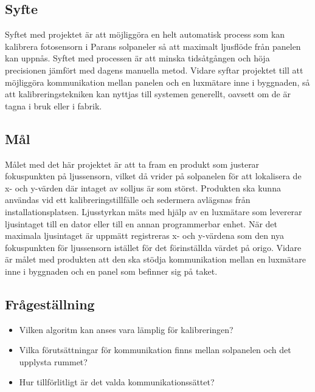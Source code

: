     \subsection{Syfte} %
    \label{sub:syfte}
          Syftet med projektet är att möjliggöra en helt automatisk process som kan kalibrera fotosensorn i Parans solpaneler så att maximalt ljusflöde från panelen kan uppnås. Syftet med processen är att minska tidsåtgången och höja precisionen jämfört med dagens manuella metod. 
          Vidare syftar projektet till att möjliggöra kommunikation mellan panelen och en luxmätare inne i byggnaden, så att kalibreringstekniken kan nyttjas till systemen generellt, oavsett om de är tagna i bruk eller i fabrik.

    \subsection{Mål} %
    \label{sub:mal}
        Målet med det här projektet är att ta fram en produkt som justerar fokuspunkten på ljussensorn, vilket då vrider på solpanelen för att lokalisera de x- och y-värden där intaget av solljus är som störst. Produkten ska kunna användas vid ett kalibreringstillfälle och sedermera avlägsnas från installationsplatsen.
        Ljusstyrkan mäts med hjälp av en luxmätare som levererar ljusintaget till en dator eller till en annan programmerbar enhet. 
        När det maximala ljusintaget är uppmätt registreras x- och y-värdena som den nya fokuspunkten för ljussensorn istället för det förinställda värdet på origo. 
        Vidare är målet med produkten att den ska stödja kommunikation mellan en luxmätare inne i byggnaden och en panel som befinner sig på taket. 


    \subsection{Frågeställning} %
    \label{sub:fragestallning}
        \begin{itemize}
            \item Vilken algoritm kan anses vara lämplig för kalibreringen?
            \item Vilka förutsättningar för kommunikation finns mellan solpanelen och det upplysta rummet? 
            \item Hur tillförlitligt är det valda kommunikationssättet? 
            
        \end{itemize}

